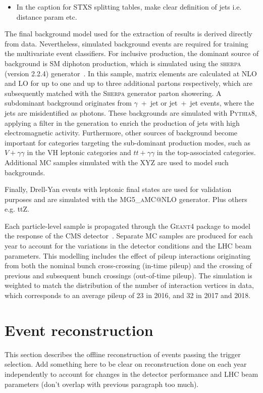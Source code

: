 \begin{itemize}
    \item In the caption for STXS splitting tables, make clear definition of jets i.e. distance param etc.
\end{itemize}

The final background model used for the extraction of results is derived directly from data. Nevertheless, simulated background events are required for training the multivariate event classifiers. For inclusive production, the dominant source of background is SM diphoton production, which is simulated using the \textsc{sherpa} (version 2.2.4) generator~\cite{}. In this sample, matrix elements are calculated at NLO and LO for up to one and up to three additional partons respectively, which are subsequently matched with the \textsc{Sherpa} generator parton showering. A subdominant background originates from $\gamma$~+~jet or jet~+~jet events, where the jets are misidentified as photons. These backgrounds are simulated with \textsc{Pythia8}, applying a filter in the generation to enrich the production of jets with high electromagnetic activity. Furthermore, other sources of background become important for categories targeting the sub-dominant production modes, such as $V+\gamma\gamma$ in the VH leptonic categories and $tt+\gamma\gamma$ in the top-associated categories. Additional MC samples simulated with the XYZ are used to model such backgrounds.

Finally, Drell-Yan events with leptonic final states are used for validation purposes and are simulated with the \textsc{MG5\_aMC@NLO} generator. Plus others e.g. ttZ.

Each particle-level sample is propagated through the \textsc{Geant4} package to model the response of the CMS detector~\cite{}. Separate MC samples are produced for each year to account for the variations in the detector conditions and the LHC beam parameters. This modelling includes the effect of pileup interactions originating from both the nominal bunch cross-crossing (in-time pileup) and the crossing of previous and subsequent bunch crossings (out-of-time pileup). The simulation is weighted to match the distribution of the number of interaction vertices in data, which corresponds to an average pileup of 23 in 2016, and 32 in 2017 and 2018.





\newpage
\section{Event reconstruction}\label{sec:event_reconstruction}
This section describes the offline reconstruction of events passing the trigger selection. Add something here to be clear on reconstruction done on each year independently to account for changes in the detector performance and LHC beam parameters (don't overlap with previous paragraph too much).

